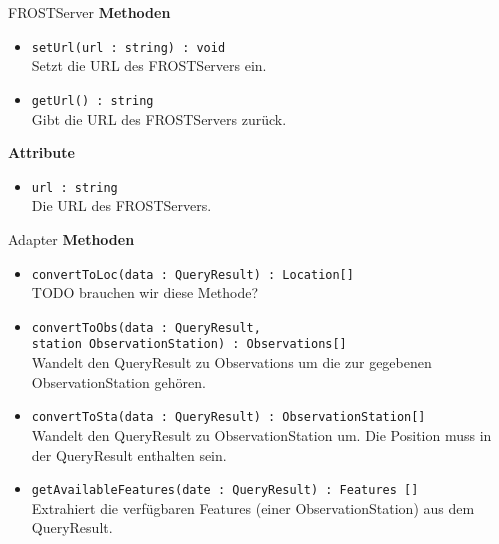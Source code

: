 \begin{Class}{FROSTServer}
    \textbf{Methoden}
    \begin{itemize}
        \item \texttt{setUrl(url : string) : void}
        \\Setzt die URL des FROSTServers ein.
        \item \texttt{getUrl() : string}
        \\Gibt die URL des FROSTServers zurück.
    \end{itemize}
    
    \textbf{Attribute}
    \begin{itemize}
        \item \texttt{url : string}
        \\Die URL des FROSTServers.
    \end{itemize}
\end{Class}



\begin{Class}{Adapter}
    \textbf{Methoden}
    \begin{itemize}
        \item \texttt{convertToLoc(data : QueryResult) : Location[]}
        \\TODO brauchen wir diese Methode?
        \item \texttt{convertToObs(data : QueryResult,
        \\station ObservationStation) : Observations[]}
        \\Wandelt den QueryResult zu Observations um die zur gegebenen ObservationStation gehören.
        \item \texttt{convertToSta(data : QueryResult) : ObservationStation[]}
        \\Wandelt den QueryResult zu ObservationStation um. Die Position muss in der QueryResult enthalten sein.
        \item \texttt{getAvailableFeatures(date : QueryResult) : Features []}
        \\Extrahiert die verfügbaren Features (einer ObservationStation) aus dem QueryResult.
    \end{itemize}
\end{Class}

